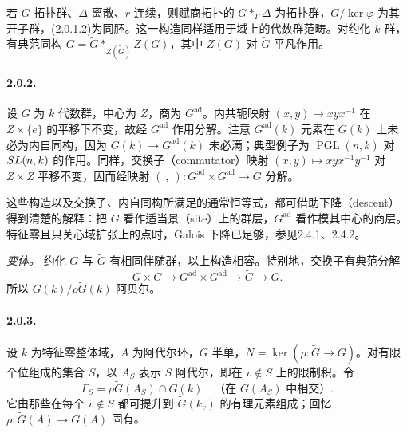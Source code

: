 若 $G$ 拓扑群、$\Delta$ 离散、$r$ 连续，则赋商拓扑的 $G*_{\Gamma}\Delta$ 为拓扑群，$G/\ker\varphi$ 为其开子群，(2.0.1.2)为同胚。这一构造同样适用于域上的代数群范畴。对约化 $k$ 群，有典范同构 $G=\widetilde G*_{Z(\widetilde G)}Z(G)$，其中 $Z(G)$ 对 $\widetilde G$ 平凡作用。
\paragraph*{2.0.2.} 设 $G$ 为 $k$ 代数群，中心为 $Z$，商为 $G^{\mathrm{ad}}$。内共轭映射 $(x,y)\mapsto xyx^{-1}$ 在 $Z\times\{e\}$ 的平移下不变，故经 $G^{\mathrm{ad}}$ 作用分解。注意 $G^{\mathrm{ad}}(k)$ 元素在 $G(k)$ 上未必为内自同构，因为 $G(k)\to G^{\mathrm{ad}}(k)$ 未必满；典型例子为 $\operatorname{PGL}(n,k)$ 对 $SL(n,k)$ 的作用。同样，交换子（commutator）映射 $(x,y)\mapsto xyx^{-1}y^{-1}$ 对 $Z\times Z$ 平移不变，因而经映射 $(\ ,\ ):G^{\mathrm{ad}}\times G^{\mathrm{ad}}\to G$ 分解。

这些构造以及交换子、内自同构所满足的通常恒等式，都可借助下降（descent）得到清楚的解释：把 $G$ 看作适当景（site）上的群层，$G^{\mathrm{ad}}$ 看作模其中心的商层。特征零且只关心域扩张上的点时，Galois 下降已足够，参见2.4.1、2.4.2。

\emph{变体。} 约化 $G$ 与 $\widetilde G$ 有相同伴随群，以上构造相容。特别地，交换子有典范分解
\[
 G\times G\longrightarrow G^{\mathrm{ad}}\times G^{\mathrm{ad}}
 \longrightarrow\widetilde G\longrightarrow G.
\]
所以 $G(k)/\rho\widetilde G(k)$ 阿贝尔。
\paragraph*{2.0.3.} 设 $k$ 为特征零整体域，$A$ 为阿代尔环，$G$ 半单，$N=\ker(\rho:\widetilde G\to G)$。对有限个位组成的集合 $S$，以 $A_S$ 表示 $S$ 阿代尔，即在 $v\notin S$ 上的限制积。令
\[
 \Gamma_S=\rho\widetilde G(A_S)\cap G(k)\quad\text{（在 }G(A_S)\text{ 中相交）}.
\]
它由那些在每个 $v\notin S$ 都可提升到 $\widetilde G(k_v)$ 的有理元素组成；回忆 $\rho:\widetilde G(A)\to G(A)$ 固有。

